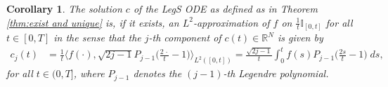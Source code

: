 \documentclass{article}
\newtheorem{corollary}{Corollary}
\theoremstyle{definition}
\begin{document}
\begin{corollary} \label{cor:sol_legen_form}
    The solution $c$ of the LegS ODE as defined as in Theorem \ref{thm:exist and unique} is, if it exists, an $L^2$-approximation of $f$ on $\frac{1}{t}\mathbb{I}_{[0,t]}$ for all $t \in [0,T]$ in the sense that the $j$-th component of $c(t) \in \mathbb{R}^N$ is given by
    \begin{align} \label{eq:sol_legen_form}
        c_j(t) &= \frac{1}{t} \Big\langle f(\cdot ), \sqrt{2j-1} P_{j-1}\big(\tfrac{2\,\cdot} {t}-1\big) \Big\rangle_{L^2([0,t])}
    =
    \frac{\sqrt{2j-1}}{t} \int_0^t f(s) P_{j-1}\big(\tfrac{2s} {t}-1\big) \;ds,
    \end{align}
    for all $t \in (0,T]$, where $P_{j-1}$ denotes the $(j-1)$-th Legendre polynomial. 
\end{corollary}
\end{document}
